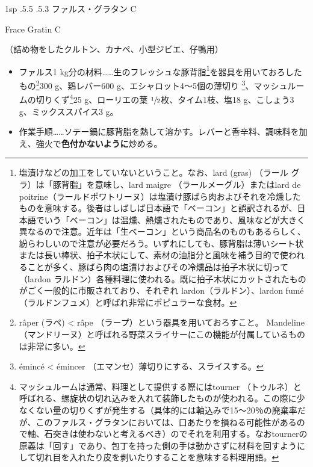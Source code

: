 \documentclass[14Q,a4paperpaper,]{ltjsbook}
\makeatletter
\renewcommand{\headfont}{\gtfamily\sffamily\bfseries}%
\renewcommand{\ldots}{\noindent…}
\let\footnotes@ve=\footnote
\def\footnote{\inhibitglue\footnotes@ve}
\newenvironment{recette}{\setlength{\parindent}{0pt}\begin{spacing}{0.8}\begin{multicols}{2}\setlength\topskip{.8\baselineskip}}{\end{multicols}\end{spacing}}
\newcommand{\medlarge}{\fontsize{11}{13}\selectfont}
\renewcommand{\subsubsection}{\@startsection{subsubsection}{3}{\z@}%
    {1sp \@plus.5\Cdp \@minus.5\Cdp}%
    {\if@slide .5\Cvs \@plus.3\Cdp \else \z@ \fi}%
    {\normalfont\medlarge\headfont\leftskip -1\zw}}
\newenvironment{frsubenv}{\begin{spacing}{0.2}\setlength{\leftskip}{-1\zw}\bfseries}{\end{spacing}\normalfont\normalsize\setlength{\leftskip}{0pt}\par\vspace{1.1\zw}}
\let\frac\sfrac
\makeatother
\begin{document}
\begin{recette}

\hypertarget{farce-gratin-c}{%
\subsubsection{ファルス・グラタン C}\label{farce-gratin-c}}

\begin{frsubenv}

Frace Gratin C

\end{frsubenv}


（詰め物をしたクルトン、カナペ、小型ジビエ、仔鴨用）

\begin{itemize}
\item
  ファルス1 kg分の材料\ldots{}\ldots{}生のフレッシュな豚背脂\footnote{塩漬けなどの加工をしていないということ。なお、lard
    (gras) （ラール グラ）は「豚背脂」を意味し、lard maigre
    （ラールメーグル）またはlard de
    poitrine（ラールドポワトリーヌ）は塩漬け豚ばら肉およびそれを冷燻したものを意味する。後者はしばしば日本語で「ベーコン」と誤訳されるが、日本語でいう「ベーコン」は温燻、熱燻されたものであり、風味などが大きく異なるので注意。近年は「生ベーコン」という商品名のものもあるらしく、紛らわしいので注意が必要だろう。いずれにしても、豚背脂は薄いシート状または長い棒状、拍子木状にして、素材の油脂分と風味を補う目的で使われることが多く、豚ばら肉の塩漬けおよびその冷燻品は拍子木状に切って（lardon
    ラルドン）各種料理に使われる。既に拍子木状にカットされたものがごく一般的に市販されており、それぞれ
    lardon（ラルドン）、lardon
    fumé（ラルドンフュメ）と呼ばれ非常にポピュラーな食材。}を器具を用いておろしたもの\footnote{râper
    (ラペ) \textless{} râpe （ラープ）という器具を用いておろすこと。
    Mandeline
    （マンドリーヌ）と呼ばれる野菜スライサーにこの機能が付属しているものは非常に多い。}300
  g、鶏レバー600 g、エシャロット4〜5個の薄切り \footnote{émincé
    \textless{} émincer （エマンセ）薄切りにする、スライスする。}、マッシュルームの切りくず\footnote{マッシュルームは通常、料理として提供する際にはtourner
    （トゥルネ）と呼ばれる、螺旋状の切れ込みを入れて装飾したものが使われる。この際に少なくない量の切りくずが発生する（具体的には軸込みで15〜20％の廃棄率だが、このファルス・グラタンにおいては、口あたりを損ねる可能性があるので軸、石突きは使わないと考えるべき）のでそれを利用する。なおtournerの原義は「回す」であり、包丁を持った側の手は動かさずに材料を回すようにして切れ目を入れたり皮を剥いたりすることを意味する料理用語。}25
  g、ローリエの葉 \(\frac{1}{2}\)枚、タイム1枝、塩18 g、こしょう3
  g、ミックススパイス3 g。
\item
  作業手順\ldots{}\ldots{}ソテー鍋に豚背脂を熱して溶かす。レバーと香辛料、調味料を加え、強火で\textbf{色付かないように}炒める。
\end{itemize}


\end{recette}
\end{document}
